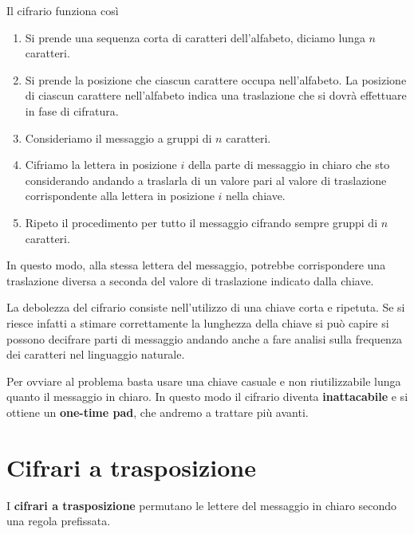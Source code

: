 Il cifrario funziona cos\`i
\begin{enumerate}
	\item Si prende una sequenza corta di caratteri dell'alfabeto, diciamo lunga $n$ caratteri.
	\item Si prende la posizione che ciascun carattere occupa nell'alfabeto. La posizione di ciascun carattere nell'alfabeto
	      indica una traslazione che si dovr\`a effettuare in fase di cifratura.
	\item Consideriamo il messaggio a gruppi di $n$ caratteri.
	\item Cifriamo la lettera in posizione $i$ della parte di messaggio in chiaro che sto considerando andando a traslarla
	      di un valore pari al valore di traslazione corrispondente alla lettera in posizione $i$ nella chiave.
	\item Ripeto il procedimento per tutto il messaggio cifrando sempre gruppi di $n$ caratteri.
\end{enumerate}
In questo modo, alla stessa lettera del messaggio, potrebbe corrispondere una traslazione diversa a seconda del valore di
traslazione indicato dalla chiave.

La debolezza del cifrario consiste nell'utilizzo di una chiave corta e ripetuta. Se si riesce infatti a stimare correttamente
la lunghezza della chiave si pu\`o capire si possono decifrare parti di messaggio andando anche a fare analisi sulla frequenza
dei caratteri nel linguaggio naturale.

Per ovviare al problema basta usare una chiave casuale e non riutilizzabile lunga quanto il messaggio in chiaro. In questo
modo il cifrario diventa \textbf{inattacabile} e si ottiene un \textbf{one-time pad}, che andremo a trattare pi\`u avanti.

\section{Cifrari a trasposizione}
I \textbf{cifrari a trasposizione} permutano le lettere del messaggio in chiaro secondo una regola prefissata.